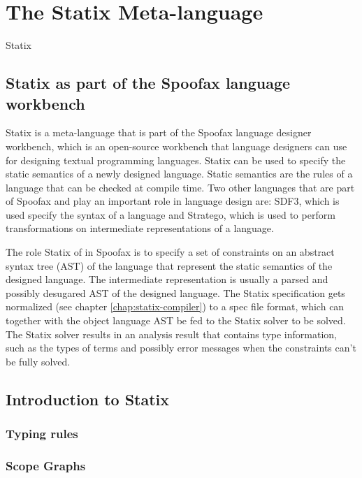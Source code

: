 
\chapter{\label{chap:statix-meta-language}The Statix Meta-language}

Statix \autocite{AntwerpenPRV18}

\section{Statix as part of the Spoofax language workbench}

Statix is a meta-language that is part of the Spoofax language designer workbench, which is an open-source workbench that language designers can use for designing textual programming languages. Statix can be used to specify the static semantics of a newly designed language. Static semantics are the rules of a language that can be checked at compile time. Two other languages that are part of Spoofax and play an important role in language design are: SDF3, which is used specify the syntax of a language and Stratego, which is used to perform transformations on intermediate representations of a language.

The role Statix of in Spoofax is to specify a set of constraints on an abstract syntax tree (AST) of the language that represent the static semantics of the designed language. The intermediate representation is usually a parsed and possibly desugared AST of the designed language.
The Statix specification gets normalized (see chapter \ref{chap:statix-compiler}) to a spec file format, which can together with the object language AST be fed to the Statix solver to be solved. The Statix solver results in an analysis result that contains type information, such as the types of terms and possibly error messages when the constraints can't be fully solved.

\section{Introduction to Statix}

\subsection{Typing rules}

\subsection{Scope Graphs}
